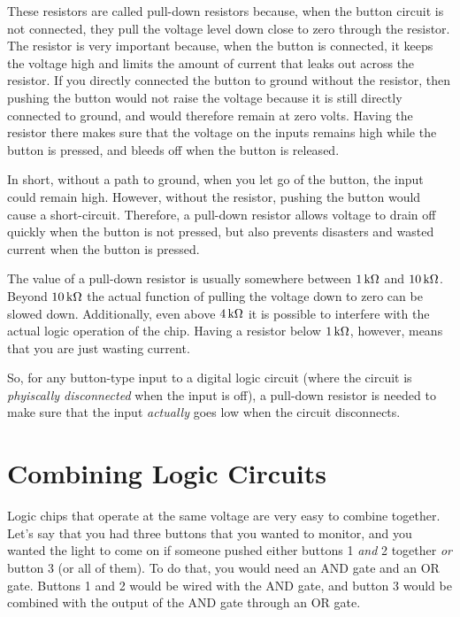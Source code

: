 These resistors are called pull-down resistors because, when the button circuit is not connected, they pull the voltage level down close to zero through the resistor.
The resistor is very important because, when the button is connected, it keeps the voltage high and limits the amount of current that leaks out across the resistor.
If you directly connected the button to ground without the resistor, then pushing the button would not raise the voltage because it is still directly connected to ground, and would therefore remain at zero volts.  
Having the resistor there makes sure that the voltage on the inputs remains high while the button is pressed, and bleeds off when the button is released.

In short, without a path to ground, when you let go of the button, the input could remain high.
However, without the resistor, pushing the button would cause a short-circuit.
Therefore, a pull-down resistor allows voltage to drain off quickly when the button is not pressed, but also prevents disasters and wasted current when the button is pressed.

The value of a pull-down resistor is usually somewhere between $1\,\si{\kilo\ohm}$ and $10\,\si{\kilo\ohm}$.  
Beyond $10\,\si{\kilo\ohm}$ the actual function of pulling the voltage down to zero can be slowed down.  
Additionally, even above $4\,\si{\kilo\ohm}$ it is possible to interfere with the actual logic operation of the chip.
Having a resistor below $1\,\si{\kilo\ohm}$, however, means that you are just wasting current.

So, for any button-type input to a digital logic circuit (where the circuit is \emph{phyiscally disconnected} when the input is off), a pull-down resistor is needed to make sure that the input \emph{actually} goes low when the circuit disconnects.

\section{Combining Logic Circuits}

Logic chips that operate at the same voltage are very easy to combine together.
Let's say that you had three buttons that you wanted to monitor, and you wanted the light to come on if someone pushed either buttons 1 \emph{and} 2 together \emph{or} button 3 (or all of them).
To do that, you would need an AND gate and an OR gate.
Buttons 1 and 2 would be wired with the AND gate, and button 3 would be combined with the output of the AND gate through an OR gate.



